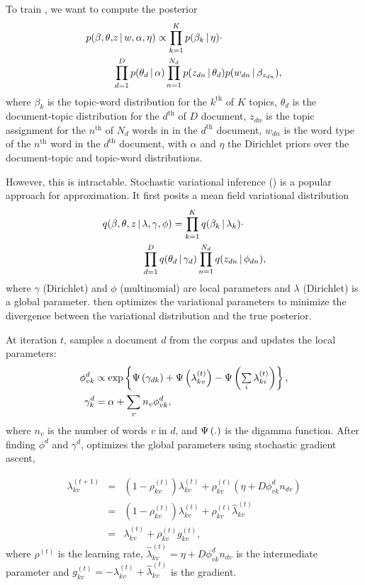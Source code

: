 To train , we want to compute the posterior
\begin{align*}
	p(\beta,\theta, & z \, | \, w, \alpha, \eta) \propto \prod_{k=1}^{K}p(\beta_k \, | \, \eta) \cdot \\
	&\prod_{d=1}^{D}p(\theta_d \, | \, \alpha)\prod_{n=1}^{N_d}p(z_{dn} \, | \, \theta_d)p(w_{dn} \, | \, \beta_{z_{dn}}),
\end{align*}
where $\beta_k$ is the topic-word distribution for the $k^\text{th}$ of $K$ topics,
$\theta_d$ is the document-topic distribution for the $d^\text{th}$ of $D$ document,
$z_{dn}$ is the topic assignment for the $n^\text{th}$ of $N_d$ words in in the $d^\text{th}$ document,
$w_{dn}$ is the word type of the $n^\text{th}$ word in the $d^\text{th}$ document,
with $\alpha$ and $\eta$ the Dirichlet priors over the document-topic and
topic-word distributions.

However, this is intractable. Stochastic variational inference
() is a popular approach for approximation. It first posits a
mean field variational distribution
\begin{align*}
	q(\beta, \theta, z \, | \, & \lambda, \gamma, \phi) = \prod_{k=1}^{K}q(\beta_k \, | \, \lambda_k) \cdot \\
	& \prod_{d=1}^{D}q(\theta_d \, | \, \gamma_d)\prod_{n=1}^{N_d}q(z_{dn} \, | \, \phi_{dn}),
\end{align*}
where $\gamma$
(Dirichlet) and $\phi$ (multinomial) are local parameters and $\lambda$
(Dirichlet) is a global parameter.
 then optimizes the variational parameters to minimize the
 divergence between the variational distribution and the true
posterior.


At iteration $t$,  samples a document $d$ from the corpus and
updates the local parameters:
\begin{align}
	\phi _{vk}^{d} & \propto \mbox{exp}\left\{  \Psi \left( \textstyle \gamma _{dk} \right) + \Psi \left( \textstyle \lambda _{kv}^{(t)} \right) - \Psi \left( \textstyle \sum\limits_i
                         {\lambda _{ki}^{(t)}}  \right)\right\},
\label{eq: update_phi} \\
\gamma _k^{d} & = \alpha  + \sum\limits_v {{n_v}\phi _{vk}^{d}},
\end{align}
where $n_v$ is the number of words $v$ in $d$, and $\Psi \left( \textstyle . \right)$ is the
digamma function. After finding $\phi^d$ and $\gamma^d$,
 optimizes the global parameters using stochastic gradient
ascent,

\begin{eqnarray}
\lambda _{kv}^{(t + 1)} &=& (1 - \rho _{kv}^{(t)})\lambda _{kv}^{(t)} + \rho _{kv}^{(t)}(\eta  + D\phi _{vk}^d{n_{dv}}) \nonumber\\
&=& (1 - \rho _{kv}^{(t)})\lambda _{kv}^{(t)} + \rho _{kv}^{(t)}\hat \lambda _{kv}^{(t)} \nonumber\\
&=& \lambda _{kv}^{(t)} + \rho _{kv}^{(t)}g_{kv}^{(t)},
\label{eq : update_lambda}
\end{eqnarray}
where $\rho^{(t)}$ is the learning rate, $\hat \lambda _{kv}^{(t)} = \eta + D{\phi^{d} _{vk}}{n_{dv}}$ is the intermediate parameter and $g_{kv}^{(t)} =  - \lambda _{kv}^{(t)} + \hat \lambda _{kv}^{(t)}$ is the gradient.




